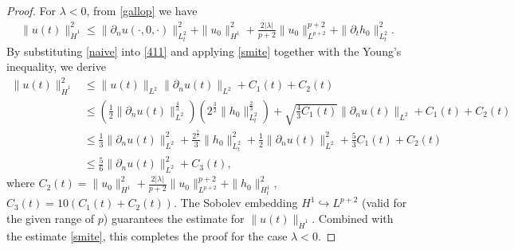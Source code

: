 \documentclass[preprint,compress,12pt]{elsarticle}
\numberwithin{equation}{section}
\begin{document}
\begin{proof}
	For $\lambda<0$, from \eqref{gallop} we have
	\begin{equation}\label{411}
		\begin{aligned}	\|u(t)\|_{\dot{H}^1}^{2}\leq\|\partial_{n}u(\cdot,0,\cdot)\|_{L^{2}_{t}}^{2}+\|u_{0}\|_{H^{1}}^{2}+\frac{2|\lambda|}{p+2}\|u_{0}\|_{L^{p+2}}^{p+2}+\|\partial_{t}h_{0}\|_{L^2_t}^{2}.
		\end{aligned}
	\end{equation}
	By substituting \eqref{naive} into \eqref{411} and applying \eqref{smite} together with the Young's inequality, we derive
	\begin{equation}\label{napkin}
		\begin{aligned}
			\|u(t)\|_{\dot{H}^1}^{2}&\leq \|u(t)\|_{L^2}\|\partial_{n}u(t)\|_{L^2}+C_{1}(t)+C_{2}(t) \\ &\leq\left(\frac{1}{2}\|\partial_{n}u(t)\|_{L^2}^{\frac{4}{3}}\right)\left(2^{\frac{3}{2}}\|h_{0}\|_{L^2_t}^{\frac{2}{3}}\right)+\sqrt{\frac{4}{3}C_{1}(t)}\|\partial_{n}u(t)\|_{L^2}+C_{1}(t)+C_{2}(t)\\ &\leq\frac{1}{3}\|\partial_{n}u(t)\|_{L^2}^{2}+\frac{2^{\frac{9}{2}}}{3}\|h_{0}\|_{L^2_t}^{2} +\frac{1}{2}\|\partial_{n}u(t)\|_{L^2}^{2}+\frac{5}{3}C_{1}(t)+C_{2}(t)\\
			&\leq\frac{5}{6}\|\partial_{n}u(t)\|_{L^2}^{2}+C_{3}(t),
		\end{aligned}
	\end{equation}
	where  $C_{2}(t)=\|u_{0}\|_{H^{1}}^{2}+\frac{2|\lambda|}{p+2}\|u_{0}\|_{L^{p+2}}^{p+2}+\|h_{0}\|_{H^{1}_{t}}^{2}, $ $C_{3}(t)=10\left(C_{1}(t)+C_{2}(t)\right)$. The Sobolev embedding $H^{1}\hookrightarrow L^{p+2}$ (valid for the given range of $p$) guarantees the estimate for $\|u(t)\|_{\dot{H}^1}$. Combined with the estimate \eqref{smite}, this completes the proof for the case $\lambda < 0$.
	

\end{proof}
\end{document}
